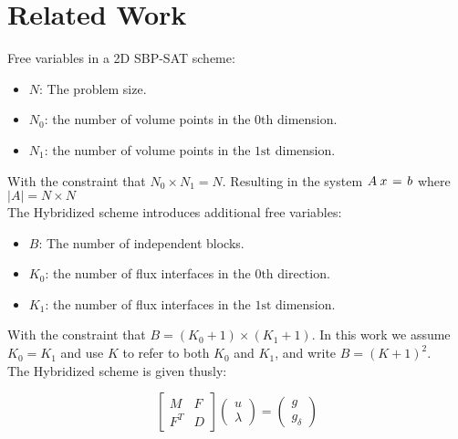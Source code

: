 \section{Related Work}

Free variables in a 2D SBP-SAT scheme:
\begin{itemize} 
    \item{$N$: The problem size.}
    \item{$N_{0}$: the number of volume points in the $0\text{th}$ 
        dimension.}
    \item{$N_{1}$: the number of volume points in the $1\text{st}$ 
        dimension.}
\end{itemize}
With the constraint that 
$N_{0} \times N_{1} = N$. Resulting in the system
$A \kern 0.25em x \kern 0.125 em = \kern 0.125 em b$ 
where 
$\vert A \vert = N \times N$ \\
\noindent
The Hybridized scheme introduces additional free variables: 
\begin{itemize} 
    \item{$B$: The number of independent blocks.}
    \item{$K_{0}$: the number of flux interfaces in the $0\text{th}$ 
        direction.}
    \item{$K_{1}$: the number of flux interfaces in the $1\text{st}$ 
        dimension.}
\end{itemize}

With the constraint that $B = (K_{0} + 1) \times (K_{1} + 1)$. In this 
work we assume $K_{0} = K_{1}$ and use $K$ to refer to both $K_{0}$ and $K_{1}$, and write $B = (K + 1)^2$. \\ 

\noindent
The Hybridized scheme is given thusly: 

\begin{equation}
    \left[\begin{array}{cc}
        M & F \\
        F^T & D
    \end{array}\right] 
    \left(\begin{array}{c}
        u \\
        \lambda
    \end{array}\right) = 
    \left(\begin{array}{c}
        g \\
        g_\delta
    \end{array}\right)
\end{equation}


